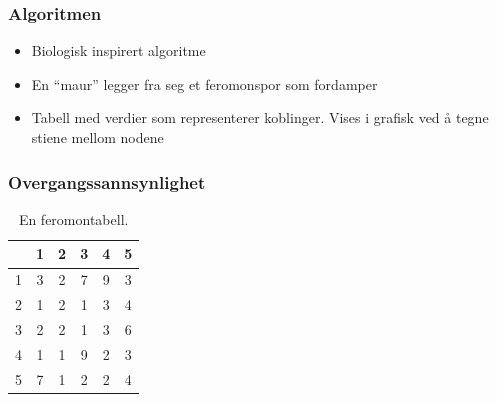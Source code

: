 \documentclass{beamer}
\begin{document}
\begin{frame}
	\frametitle{Algoritmen}
	\begin{itemize}[<+->]
		\item Biologisk inspirert algoritme
		\item En ``maur'' legger fra seg et feromonspor som fordamper
		\item Tabell med verdier som representerer koblinger. Vises i grafisk ved å tegne stiene mellom nodene
	\end{itemize}
\end{frame}

\begin{frame}[allowframebreaks]
	\frametitle{Overgangssannsynlighet}
	\begin{table}
		\caption{En feromontabell.\label{tbl:pheromone}}
		\centering
		\begin{tabular}{c | c c c c c }
			& 1 & 2 & 3 & 4 & 5 \\
			\hline
			1 & 3 & 2 & 7 & 9 & 3 \\
			2 & 1 & 2 & 1 & 3 & 4 \\
			3 & 2 & 2 & 1 & 3 & 6 \\
			4 & 1 & 1 & 9 & 2 & 3 \\
			5 & 7 & 1 & 2 & 2 & 4 \\
		\end{tabular}
	\end{table}
	\begin{figure}

\end{figure}
\end{frame}
\end{document}
